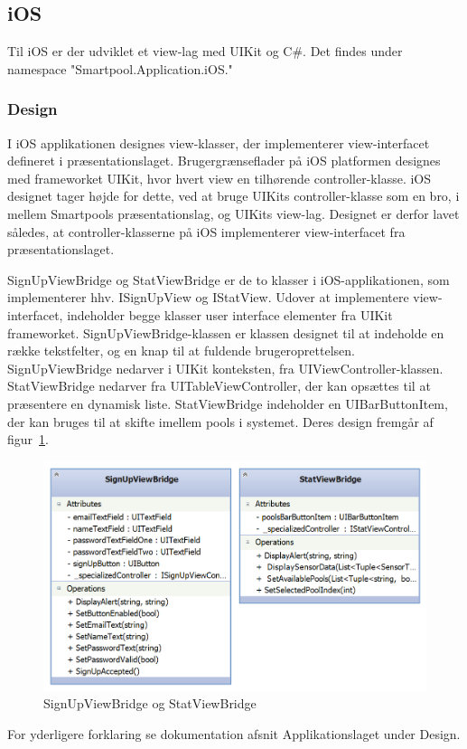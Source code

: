 \subsection{iOS}
Til iOS er der udviklet et view-lag med UIKit og C\#. Det findes under namespace "Smartpool.Application.iOS."

\subsubsection{Design}
I iOS applikationen designes view-klasser, der implementerer view-interfacet defineret i præsentationslaget. Brugergrænseflader på iOS platformen designes med frameworket UIKit, hvor hvert view en tilhørende controller-klasse. iOS designet tager højde for dette, ved at bruge UIKits controller-klasse som en bro, i mellem Smartpools præsentationslag, og UIKits view-lag. Designet er derfor lavet således, at controller-klasserne på iOS implementerer view-interfacet fra præsentationslaget.

SignUpViewBridge og StatViewBridge er de to klasser i iOS-applikationen, som implementerer hhv. ISignUpView og IStatView. Udover at implementere view-interfacet, indeholder begge klasser user interface elementer fra UIKit frameworket. SignUpViewBridge-klassen er klassen designet til at indeholde en række tekstfelter, og en knap til at fuldende brugeroprettelsen. SignUpViewBridge nedarver i UIKit konteksten, fra UIViewController-klassen. StatViewBridge nedarver fra UITableViewController, der kan opsættes til at præsentere en dynamisk liste. StatViewBridge indeholder en UIBarButtonItem, der kan bruges til at skifte imellem pools i systemet. Deres design fremgår af figur~\ref{fig:ios_viewbridges}.

\begin{figure}
	\centering
	\includegraphics[width=0.7\linewidth]{figs/design/ios_viewbridges}
	\caption{SignUpViewBridge og StatViewBridge}
	\label{fig:ios_viewbridges}
\end{figure}

For yderligere forklaring se dokumentation afsnit Applikationslaget under Design.